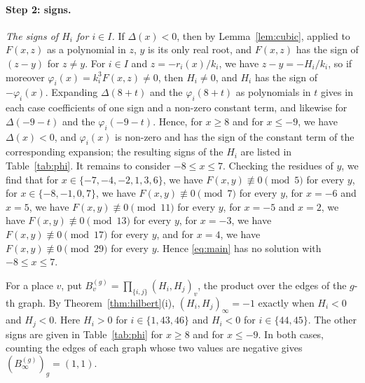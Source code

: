 \documentclass[11pt]{article}
\begin{document}
\paragraph{Step 2: signs.} \emph{The signs of $H_i$ for $i\in I$.} If $\Delta(x)<0$, then by Lemma~\ref{lem:cubic}, applied to $F(x,z)$ as a polynomial in $z$, $y$ is its only real root, and $F(x,z)$ has the sign of $(z-y)$ for $z\neq y$. For $i\in I$ and $z=-r_i(x)/k_i$, we have $z-y=-H_i/k_i$, so if moreover $\varphi_i(x)=k_i^3F(x,z)\neq0$, then $H_i\neq0$, and $H_i$ has the sign of $-\varphi_i(x)$. Expanding $\Delta(8+t)$ and the $\varphi_i(8+t)$ as polynomials in $t$ gives in each case coefficients of one sign and a non-zero constant term, and likewise for $\Delta(-9-t)$ and the $\varphi_i(-9-t)$. Hence, for $x\geq8$ and for $x\leq-9$, we have $\Delta(x)<0$, and $\varphi_i(x)$ is non-zero and has the sign of the constant term of the corresponding expansion; the resulting signs of the $H_i$ are listed in Table~\ref{tab:phi}. It remains to consider $-8\leq x\leq7$. Checking the residues of $y$, we find that for $x\in\{-7,\allowbreak -4,\allowbreak -2,\allowbreak 1,\allowbreak 3,\allowbreak 6\}$, we have $F(x,y)\not\equiv0\pmod{5}$ for every $y$, for $x\in\{-8,\allowbreak -1,\allowbreak 0,\allowbreak 7\}$, we have $F(x,y)\not\equiv0\pmod{7}$ for every $y$, for $x=-6$ and $x=5$, we have $F(x,y)\not\equiv0\pmod{11}$ for every $y$, for $x=-5$ and $x=2$, we have $F(x,y)\not\equiv0\pmod{13}$ for every $y$, for $x=-3$, we have $F(x,y)\not\equiv0\pmod{17}$ for every $y$, and for $x=4$, we have $F(x,y)\not\equiv0\pmod{29}$ for every $y$. Hence \eqref{eq:main} has no solution with $-8\leq x\leq7$.

For a place $v$, put $B^{(g)}_v=\prod_{\{i,j\}}(H_i,H_j)_v$, the product over the edges of the $g$-th graph. By Theorem~\ref{thm:hilbert}(i), $(H_i,H_j)_\infty=-1$ exactly when $H_i<0$ and $H_j<0$. Here $H_i>0$ for $i\in\{1,\allowbreak 43,\allowbreak 46\}$ and $H_i<0$ for $i\in\{44,\allowbreak 45\}$. The other signs are given in Table~\ref{tab:phi} for $x\geq8$ and for $x\leq-9$. In both cases, counting the edges of each graph whose two values are negative gives $(B^{(g)}_\infty)_g=(1,1)$.
\end{document}
